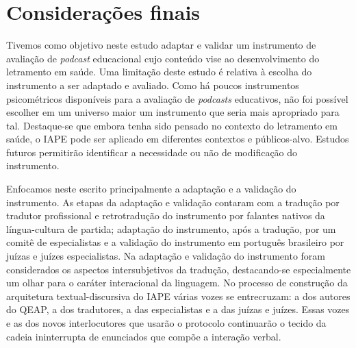 \section{Considerações finais}\label{sec-consideraçõesfinais}

Tivemos como objetivo neste estudo adaptar e validar um instrumento de avaliação de \textit{podcast} educacional cujo conteúdo vise ao desenvolvimento do letramento em saúde. Uma limitação deste estudo é relativa à escolha do instrumento a ser adaptado e avaliado. Como há poucos instrumentos psicométricos disponíveis para a avaliação de \textit{podcasts} educativos, não foi possível escolher em um universo maior um instrumento que seria mais apropriado para tal. Destaque-se que embora tenha sido pensado no contexto do letramento em saúde, o IAPE pode ser aplicado em diferentes contextos e públicos-alvo. Estudos futuros permitirão identificar a necessidade ou não de modificação do instrumento.  

Enfocamos neste escrito principalmente a adaptação e a validação do instrumento. As etapas da adaptação e validação contaram com a tradução por tradutor profissional e retrotradução do instrumento por falantes nativos da língua-cultura de partida; adaptação do instrumento, após a tradução, por um comitê de especialistas e a validação do instrumento em português brasileiro por juízas e juízes especialistas. Na adaptação e validação do instrumento foram considerados os aspectos intersubjetivos da tradução, destacando-se especialmente um olhar para o caráter interacional da linguagem. No processo de construção da arquitetura textual-discursiva do IAPE várias vozes se entrecruzam: a dos autores do QEAP, a dos tradutores, a das especialistas e a das juízas e juízes. Essas vozes e as dos novos interlocutores que usarão o protocolo continuarão o tecido da cadeia ininterrupta de enunciados que compõe a interação verbal.